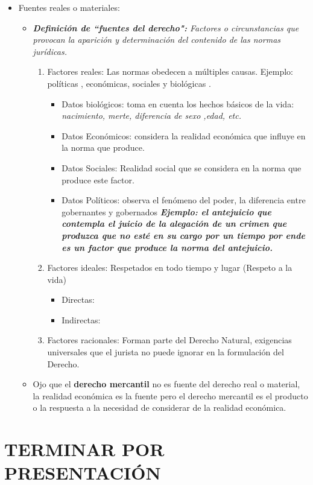 \begin{itemize}
    \item Fuentes reales o materiales:
    \begin{itemize}
        \item \emph{\textbf{Definición de ``fuentes del derecho":} Factores o circunstancias que provocan la aparición y determinación del contenido de las normas jurídicas.}
        \begin{enumerate}
            \item Factores reales: Las normas obedecen a múltiples causas. Ejemplo: políticas , económicas, sociales  y biológicas .
                \begin{itemize}
                    \item Datos biológicos: toma en cuenta los hechos básicos de la vida: \emph{nacimiento, merte, diferencia de sexo ,edad, etc.}
                    \item Datos Económicos: considera la realidad económica que influye en la norma que produce.
                    \item Datos Sociales: Realidad social que se considera en la norma que produce este factor.
                    \item Datos Políticos: observa el fenómeno del poder, la diferencia entre gobernantes y gobernados \textbf{\emph{Ejemplo: el antejuicio que contempla el juicio de la alegación de un crimen que produzca que no esté en su cargo por un tiempo por ende es un factor que produce la norma del antejuicio. }}
                \end{itemize}
            \item Factores ideales: Respetados en todo tiempo y lugar (Respeto a la vida)
                \begin{itemize}
                    \item Directas:
                    \item Indirectas:
                \end{itemize}

            \item Factores racionales: Forman parte del Derecho Natural, exigencias universales que el jurista no puede ignorar en la formulación del Derecho.

        \end{enumerate}
        
        \item Ojo que el \textbf{derecho mercantil} no es fuente del derecho real o  material, la realidad económica es la fuente pero el derecho mercantil es el producto o la respuesta a la necesidad de considerar de la realidad económica.
    \end{itemize}

\end{itemize}


\section{TERMINAR POR PRESENTACIÓN}
